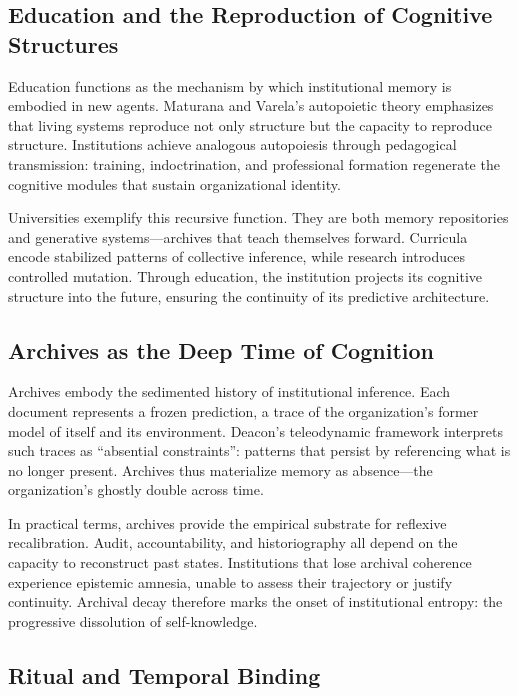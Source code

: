 \documentclass[11pt,a4paper]{article}
\begin{document}
\subsection{Education and the Reproduction of Cognitive Structures}

Education functions as the mechanism by which institutional memory is embodied in new agents.  Maturana and Varela’s autopoietic theory \citep{MaturanaVarela1980Autopoiesis} emphasizes that living systems reproduce not only structure but the capacity to reproduce structure.  Institutions achieve analogous autopoiesis through pedagogical transmission: training, indoctrination, and professional formation regenerate the cognitive modules that sustain organizational identity.  

Universities exemplify this recursive function.  They are both memory repositories and generative systems—archives that teach themselves forward.  Curricula encode stabilized patterns of collective inference, while research introduces controlled mutation.  Through education, the institution projects its cognitive structure into the future, ensuring the continuity of its predictive architecture.

\subsection{Archives as the Deep Time of Cognition}

Archives embody the sedimented history of institutional inference.  Each document represents a frozen prediction, a trace of the organization’s former model of itself and its environment.  Deacon’s teleodynamic framework \citep{Deacon2011IncompleteNature} interprets such traces as “absential constraints”: patterns that persist by referencing what is no longer present.  Archives thus materialize memory as absence—the organization’s ghostly double across time.

In practical terms, archives provide the empirical substrate for reflexive recalibration.  Audit, accountability, and historiography all depend on the capacity to reconstruct past states.  Institutions that lose archival coherence experience epistemic amnesia, unable to assess their trajectory or justify continuity.  Archival decay therefore marks the onset of institutional entropy: the progressive dissolution of self-knowledge.

\subsection{Ritual and Temporal Binding}
\end{document}
